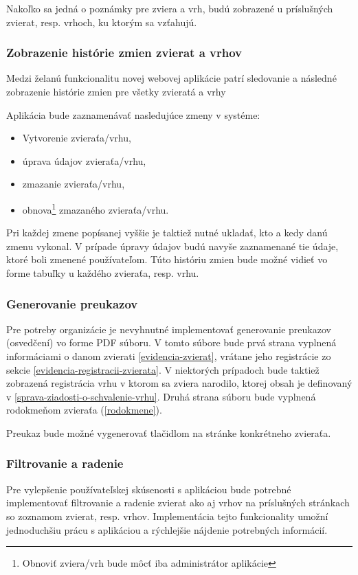 Nakoľko sa jedná o poznámky pre zviera a vrh, budú zobrazené u príslušných zvierat, resp. vrhoch, ku ktorým sa vzťahujú.

\subsubsection{Zobrazenie histórie zmien zvierat a vrhov}
Medzi želanú funkcionalitu novej webovej aplikácie patrí sledovanie a následné zobrazenie histórie zmien pre všetky zvieratá a vrhy

Aplikácia bude zaznamenávať nasledujúce zmeny v systéme:
\begin{itemize}
	\item Vytvorenie zvieraťa/vrhu,
	\item úprava údajov zvieraťa/vrhu,
	\item zmazanie zvieraťa/vrhu,
	\item obnova\footnote{Obnoviť zviera/vrh bude môcť iba administrátor aplikácie} zmazaného zvieraťa/vrhu.
\end{itemize}

Pri každej zmene popísanej vyššie je taktiež nutné ukladať, kto a kedy danú zmenu vykonal. V prípade úpravy údajov budú navyše zaznamenané tie údaje, ktoré boli zmenené používateľom. Túto históriu zmien bude možné vidieť vo forme tabuľky u každého zvieraťa, resp. vrhu.

\subsubsection{Generovanie preukazov}\label{generovanie-preukazov}
Pre potreby organizácie je nevyhnutné implementovať generovanie preukazov (osvedčení) vo forme PDF súboru. V tomto súbore bude prvá strana vyplnená informáciami o danom zvierati \ref{evidencia-zvierat}, vrátane jeho registrácie zo sekcie \ref{evidencia-registracii-zvierata}. V niektorých prípadoch bude taktiež zobrazená registrácia vrhu v ktorom sa zviera narodilo, ktorej obsah je definovaný v \ref{sprava-ziadosti-o-schvalenie-vrhu}. Druhá strana súboru bude vyplnená rodokmeňom zvieraťa (\ref{rodokmene}).

Preukaz bude možné vygenerovať tlačidlom na stránke konkrétneho zvieraťa.

\subsubsection{Filtrovanie a radenie}\label{filtrovanie-a-radenie}
Pre vylepšenie používateľskej skúsenosti s aplikáciou bude potrebné implementovať filtrovanie a radenie zvierat ako aj vrhov na príslušných stránkach so zoznamom zvierat, resp. vrhov. Implementácia tejto funkcionality umožní jednoduchšiu prácu s aplikáciou a rýchlejšie nájdenie potrebných informácií.

